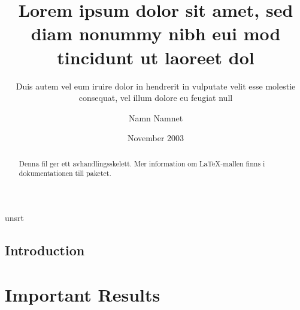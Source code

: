 \documentclass[a4paper,11pt]{kth-mag}
\title{Lorem ipsum dolor sit amet, sed diam nonummy nibh eui
       mod tincidunt ut laoreet dol}
\subtitle{Duis autem vel eum iruire dolor in hendrerit in
          vulputate velit esse molestie consequat, vel illum
          dolore eu feugiat null}
\author{Namn Namnet}
\date{November 2003}
\begin{document}
{unsrt} 

\frontmatter
\maketitle

\clearpage
{}
\begin{abstract}
  Denna fil ger ett avhandlingsskelett.
  Mer information om \LaTeX-mallen finns i
  dokumentationen till paketet.
\end{abstract}
\clearpage
\tableofcontents
\mainmatter
\chapter{Introduction}



\part{Important Results}
\end{document}
